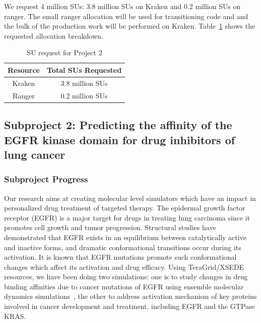 \documentclass[a4paper,11pt]{article}
\newcommand{\up}{\vspace*{-1em}}
\begin{document}
We request 4 million SUs: 3.8 million SUs on Kraken and 0.2 million SUs on ranger. The small ranger allocation will be used for transitioning code and and the bulk of the production work will be performed on Kraken. Table~\ref{table:project21} shows the requested allocation breakdown.


\begin{table}[!h]
\begin{center}
\begin{tabular}{|c|c| }
\hline 
Resource & Total SUs Requested \\ 
\hline
Kraken   & 3.8 million SUs \\
\hline
Ranger   & 0.2 million SUs \\
\hline
\end{tabular}
\end{center}
  \caption{SU request for Project 2}\label{table:project21}
\up
\end{table}


\subsection{Subproject 2: Predicting the affinity of the EGFR kinase domain for drug inhibitors of lung cancer}

\subsubsection{Subproject Progress}
Our research aims at creating molecular level simulators which have an impact in personalized drug treatment of targeted therapy. The epidermal growth factor receptor (EGFR) is a major target for drugs in treating lung carcinoma since it promotes cell growth and tumor progression. Structural studies have demonstrated that EGFR exists in an equilibrium between catalytically active and inactive forms, and dramatic conformational transitions occur during its activation. It is known that EGFR mutations promote such conformational changes which affect its activation and drug efficacy. Using TeraGrid/XSEDE resources, we have been doing two simulations: one is to study changes in drug binding affinities due to cancer mutations of EGFR using ensemble molecular dynamics simulations~\cite{Ref6,Ref7,Ref8}, the other to address activation mechanism of key proteins involved in cancer development and treatment, including EGFR and the GTPase KRAS.
\end{document}
